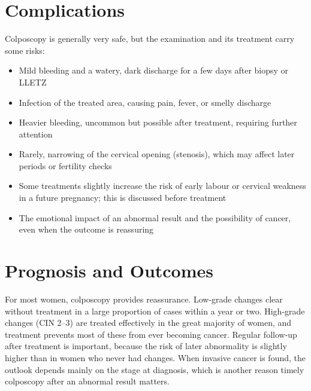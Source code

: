 \section*{Complications}
Colposcopy is generally very safe, but the examination and its treatment carry some risks:

\begin{itemize}
    \item Mild bleeding and a watery, dark discharge for a few days after biopsy or LLETZ
    \item Infection of the treated area, causing pain, fever, or smelly discharge
    \item Heavier bleeding, uncommon but possible after treatment, requiring further attention
    \item Rarely, narrowing of the cervical opening (stenosis), which may affect later periods or fertility checks
    \item Some treatments slightly increase the risk of early labour or cervical weakness in a future pregnancy; this is discussed before treatment
    \item The emotional impact of an abnormal result and the possibility of cancer, even when the outcome is reassuring
\end{itemize}

\section*{Prognosis and Outcomes}
For most women, colposcopy provides reassurance. Low-grade changes clear without treatment in a large proportion of cases within a year or two. High-grade changes (CIN 2--3) are treated effectively in the great majority of women, and treatment prevents most of these from ever becoming cancer. Regular follow-up after treatment is important, because the risk of later abnormality is slightly higher than in women who never had changes. When invasive cancer is found, the outlook depends mainly on the stage at diagnosis, which is another reason timely colposcopy after an abnormal result matters.

